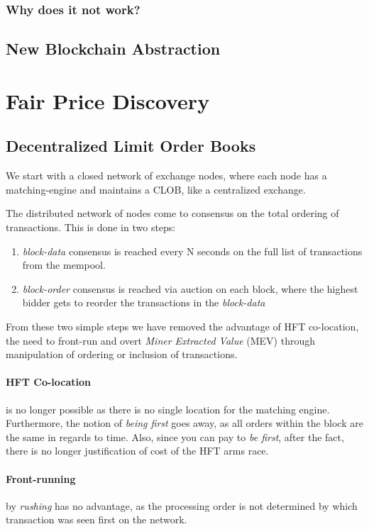 \documentclass[12pt]{article}
\begin{document}
\subsubsection*{Why does it not work?}
\subsection*{New Blockchain Abstraction}

\section{Fair Price Discovery} 

\subsection{Decentralized Limit Order Books}
We start with a closed network of exchange nodes, where each node has a matching-engine and maintains a CLOB, like a centralized exchange. 

The distributed network of nodes come to consensus on the total ordering of transactions. This is done in two steps: 

\begin{enumerate}
    \item \emph{block-data} consensus is reached every N seconds on the full list of transactions from the mempool. 
    \item \emph{block-order} consensus is reached via auction on each block, where the highest bidder gets to reorder the transactions in the \emph{block-data} 
\end{enumerate}

From these two simple steps we have removed the advantage of HFT co-location, the need to front-run and overt \emph{Miner Extracted Value} (MEV) through manipulation of ordering or inclusion of transactions.

\paragraph*{HFT Co-location} is no longer possible as there is no single location for the matching engine. Furthermore, the notion of \emph{being first} goes away, as all orders within the block are the same in regards to time. Also, since you can pay to \emph{be first}, after the fact, there is no longer justification of cost of the HFT arms race. 

\paragraph*{Front-running} by \emph{rushing} has no advantage, as the processing order is not determined by which transaction was seen first on the network. 
\end{document}
